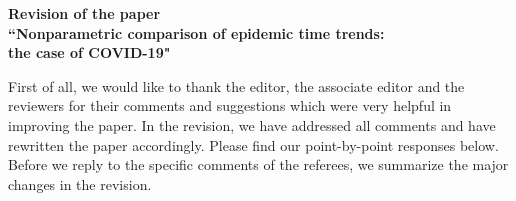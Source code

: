 \documentclass[a4paper,12pt]{article}
\begin{document}
\begin{center} 
{\large \bf Revision of the paper} \\[0.1cm]
{\large \bf ``Nonparametric comparison of epidemic time trends:} \\[0.1cm]
{\large \bf the case of COVID-19"} 
\end{center}
\vspace{7pt}



First of all, we would like to thank the editor, the associate editor and the reviewers for their comments and suggestions which were very helpful in improving the paper. In the revision, we have addressed all comments and have rewritten the paper accordingly. Please find our point-by-point responses below. %
Before we reply to the specific comments of the referees, we summarize the major changes in the revision.

\vspace{10pt}
\end{document}
